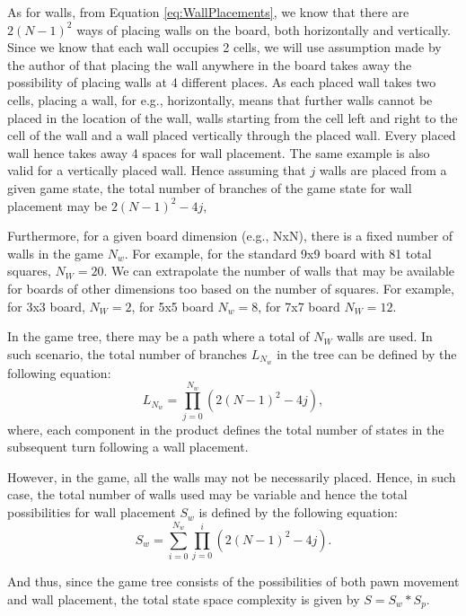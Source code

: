 As for walls, from Equation \ref{eq:WallPlacements}, we know that there are $2(N-1)^2$ ways of placing walls on the board, both horizontally and vertically. Since we know that each wall occupies 2 cells, we will use assumption made by the author of \citep{Mertens2006Quoridor} that placing the wall anywhere in the board takes away the possibility of placing walls at 4 different places. As each placed wall takes two cells, placing a wall, for e.g., horizontally, means that further walls cannot be placed in the location of the wall, walls starting from the cell left and right to the cell of the wall and a wall placed vertically through the placed wall. Every placed wall hence takes away 4 spaces for wall placement. The same example is also valid for a vertically placed wall. Hence assuming that $j$ walls are placed from a given game state, the total number of branches of the game state for wall placement may be $2(N-1)^2 - 4j$,

Furthermore, for a given board dimension (e.g., NxN), there is a fixed number of walls in the game $N_w$. For example, for the standard 9x9 board with 81 total squares, $N_W = 20$. We can extrapolate the number of walls that may be available for boards of other dimensions too based on the number of squares. For example, for 3x3 board, $N_W = 2$, for 5x5 board $N_w = 8$, for 7x7 board $N_W = 12$.

In the game tree, there may be a path where a total of $N_W$ walls are used. In such scenario, the total number of branches $L_{N_w}$ in the tree can be defined by the following equation:
\begin{equation}
    L_{N_w} = \prod_{j=0}^{N_w} (2(N-1)^2 - 4j),
\end{equation}
where, each component in the product defines the total number of states in the subsequent turn following a wall placement.

However, in the game, all the walls may not be necessarily placed. Hence, in such case, the total number of walls used may be variable and hence the total possibilities for wall placement $S_w$ is defined by the following equation:
\begin{equation}
    S_w = \sum_{i=0}^{N_w}\prod_{j=0}^{i}(2(N-1)^2 - 4j).
\end{equation}

And thus, since the game tree consists of the possibilities of both pawn movement and wall placement, the total state space complexity is given by $S = S_w * S_p$. \citep{Mertens2006Quoridor}

